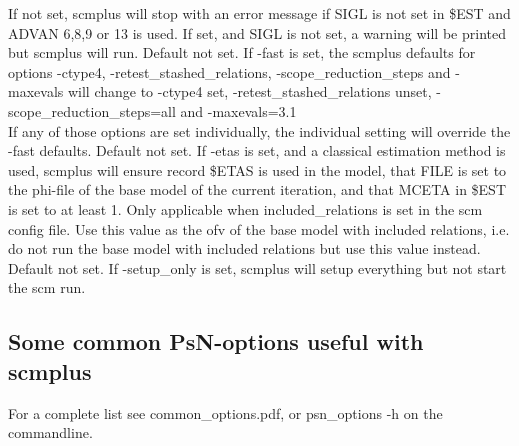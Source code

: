 \documentclass[hideglossary,notoc,hidelof,hidelot,hideTheSignaturePage,hideLinkCurrent,hideloa,pdfLatex,noClient,notitle,hideConfidential]{PMXstyle-20190820}
\newcommand{\maxevals}{3.1\xspace}
\begin{document}
\begin{optionlist}
If not set, scmplus will stop with an error message if
SIGL is not set in \$EST and ADVAN 6,8,9 or 13 is used.
If set, and SIGL is not set, a warning will be printed but scmplus will run.
\nextopt
{}
Default not set. 
If -fast is set, the scmplus defaults for options -ctype4, -retest\_stashed\_relations,
-scope\_reduction\_steps and -maxevals will change to -ctype4 set, 
-retest\_stashed\_relations unset, -scope\_reduction\_steps=all and -maxevals=\maxevals\\ 
If any of those options are set individually, the individual setting will override the
-fast defaults.
\nextopt
{}
Default not set. 
If -etas is set, and a classical estimation method is used, scmplus will ensure record \$ETAS is used
in the model, that FILE is set to the phi-file of the base model of the current iteration,
and that MCETA in \$EST is set to at least 1.
\nextopt
{}
Only applicable when included\_relations is set in the scm config file.
Use this value as the ofv of the base model with included relations,
i.e. do not run the base model with included relations but use
this value instead.
\nextopt
{}
Default not set. 
If -setup\_only is set, scmplus will setup everything but not start the scm run.
\nextopt
\end{optionlist}

\subsection{Some common PsN-options useful with scmplus}
For a complete list see common\_options.pdf, or psn\_options -h on the commandline.


\end{document}
